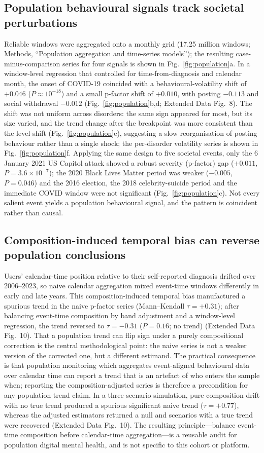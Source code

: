 \documentclass[11pt]{article}
\newcommand{\edfig}[1]{Extended Data Fig.~#1}
\begin{document}
\subsection*{Population behavioural signals track societal perturbations}
Reliable windows were aggregated onto a monthly grid (17.25 million windows; Methods, ``Population aggregation and time-series models''); the resulting case-minus-comparison series for four signals is shown in Fig.~\ref{fig:population}a. In a
window-level regression that controlled for time-from-diagnosis and calendar month, the onset
of COVID-19 coincided with a behavioural-volatility shift of $+0.046$ ($P\approx10^{-18}$) and
a small p-factor shift of $+0.010$, with posting $-0.113$ and social withdrawal $-0.012$
(Fig.~\ref{fig:population}b,d; \edfig{8}). The shift was not uniform across disorders: the
same sign appeared for most, but its size varied, and the trend change after the breakpoint was
more consistent than the level shift (Fig.~\ref{fig:population}e), suggesting a slow
reorganisation of posting behaviour rather than a single shock; the per-disorder volatility
series is shown in Fig.~\ref{fig:population}f. Applying the same design to five societal events, only the 6
January 2021 US Capitol attack showed a robust severity (p-factor) gap ($+0.011$,
$P=3.6\times10^{-7}$); the 2020 Black Lives Matter period was weaker ($-0.005$, $P=0.046$) and
the 2016 election, the 2018 celebrity-suicide period and the immediate COVID window were not
significant (Fig.~\ref{fig:population}c). Not every salient event yields a population
behavioural signal, and the pattern is coincident rather than causal.

\subsection*{Composition-induced temporal bias can reverse population conclusions}
Users' calendar-time position relative to their self-reported diagnosis drifted over
2006--2023, so naive calendar aggregation mixed event-time windows differently in early and
late years. This composition-induced temporal bias manufactured a spurious trend in the naive
p-factor series (Mann--Kendall $\tau=+0.31$); after balancing event-time composition by band
adjustment and a window-level regression, the trend reversed to $\tau=-0.31$ ($P=0.16$; no
trend) (\edfig{10}). That a population trend can flip sign under
a purely compositional correction is the central methodological point: the naive series is not
a weaker version of the corrected one, but a different estimand. The practical consequence is
that population monitoring which aggregates event-aligned behavioural data over calendar time
can report a trend that is an artefact of who enters the sample when; reporting the
composition-adjusted series is therefore a precondition for any population-trend claim. In a
three-scenario simulation, pure composition drift with no true trend produced a spurious
significant naive trend ($\tau=+0.77$), whereas the adjusted estimators returned a null and
scenarios with a true trend were recovered (\edfig{10}). The resulting principle---balance
event-time composition before calendar-time aggregation---is a reusable audit for population
digital mental health, and is not specific to this cohort or platform.
\end{document}
